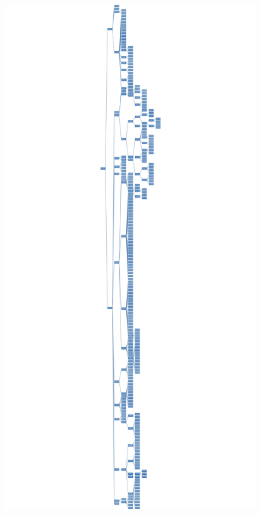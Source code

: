\documentclass[12pt,a4paper,oneside]{book}
\begin{document}
\newpage
\begin{figure}[H]
    \centering
    \includegraphics[scale=0.1]{Images/tree2.jpg}
    \caption{ }
    \label{ }
\end{figure}
\end{document}
